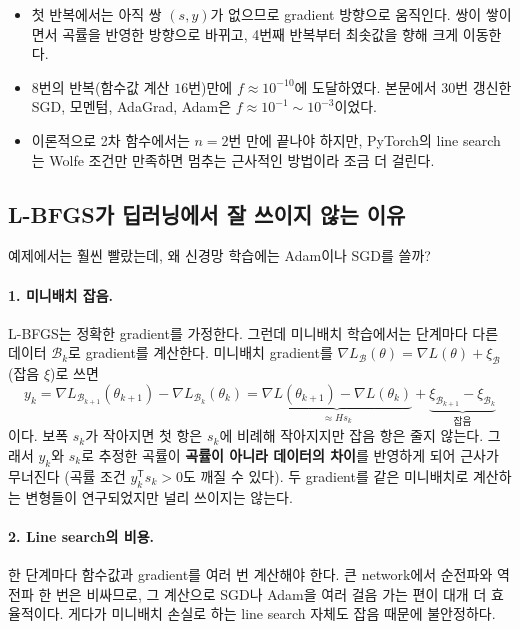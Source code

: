 \documentclass[11pt,a4paper]{article}
\newcommand{\T}{^{\mathsf T}}
\begin{document}
\begin{itemize}[leftmargin=1.8em]
\item 첫 반복에서는 아직 쌍 $(s,y)$가 없으므로 gradient 방향으로 움직인다.
쌍이 쌓이면서 곡률을 반영한 방향으로 바뀌고, 4번째 반복부터 최솟값을 향해 크게 이동한다.
\item $8$번의 반복(함수값 계산 $16$번)만에 $f\approx10^{-10}$에 도달하였다.
본문에서 $30$번 갱신한 SGD, 모멘텀, AdaGrad, Adam은 $f\approx10^{-1}\sim10^{-3}$이었다.
\item 이론적으로 2차 함수에서는 $n=2$번 만에 끝나야 하지만,
PyTorch의 line search는 Wolfe 조건만 만족하면 멈추는 근사적인 방법이라 조금 더 걸린다.
\end{itemize}

\subsection{L-BFGS가 딥러닝에서 잘 쓰이지 않는 이유}

예제에서는 훨씬 빨랐는데, 왜 신경망 학습에는 Adam이나 SGD를 쓸까?

\paragraph{1. 미니배치 잡음.}
L-BFGS는 정확한 gradient를 가정한다.
그런데 미니배치 학습에서는 단계마다 다른 데이터 $\mathcal B_k$로 gradient를 계산한다.
미니배치 gradient를 $\nabla L_{\mathcal B}(\theta)=\nabla L(\theta)+\xi_{\mathcal B}$ (잡음 $\xi$)로 쓰면
\[
y_k=\nabla L_{\mathcal B_{k+1}}(\theta_{k+1})-\nabla L_{\mathcal B_k}(\theta_k)
=\underbrace{\nabla L(\theta_{k+1})-\nabla L(\theta_k)}_{\approx H s_k}
+\underbrace{\xi_{\mathcal B_{k+1}}-\xi_{\mathcal B_k}}_{\text{잡음}}
\]
이다. 보폭 $s_k$가 작아지면 첫 항은 $s_k$에 비례해 작아지지만 잡음 항은 줄지 않는다.
그래서 $y_k$와 $s_k$로 추정한 곡률이 \textbf{곡률이 아니라 데이터의 차이}를 반영하게 되어 근사가 무너진다
(곡률 조건 $y_k\T s_k>0$도 깨질 수 있다).
두 gradient를 같은 미니배치로 계산하는 변형들이 연구되었지만 널리 쓰이지는 않는다.

\paragraph{2. Line search의 비용.}
한 단계마다 함수값과 gradient를 여러 번 계산해야 한다.
큰 network에서 순전파와 역전파 한 번은 비싸므로,
그 계산으로 SGD나 Adam을 여러 걸음 가는 편이 대개 더 효율적이다.
게다가 미니배치 손실로 하는 line search 자체도 잡음 때문에 불안정하다.
\end{document}

